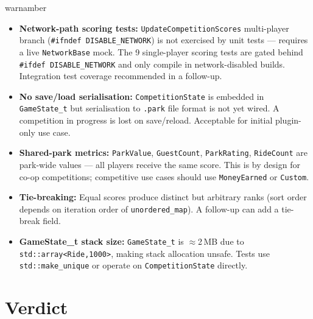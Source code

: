 \documentclass[12pt,a4paper]{article}
\begin{document}
\begin{calloutbox}[title={Honest gaps --- not blockers for merge}]{warnamber}
\begin{itemize}[noitemsep]
  \item \textbf{Network-path scoring tests:} \texttt{UpdateCompetitionScores} multi-player branch
    (\texttt{\#ifndef DISABLE\_NETWORK}) is not exercised by unit tests --- requires a live \texttt{NetworkBase}
    mock. The 9 single-player scoring tests are gated behind \texttt{\#ifdef DISABLE\_NETWORK} and only
    compile in network-disabled builds. Integration test coverage recommended in a follow-up.
  \item \textbf{No save/load serialisation:} \texttt{CompetitionState} is embedded in \texttt{GameState\_t}
    but serialisation to \texttt{.park} file format is not yet wired. A competition in progress is lost
    on save/reload. Acceptable for initial plugin-only use case.
  \item \textbf{Shared-park metrics:} \texttt{ParkValue}, \texttt{GuestCount}, \texttt{ParkRating},
    \texttt{RideCount} are park-wide values --- all players receive the same score. This is by design
    for co-op competitions; competitive use cases should use \texttt{MoneyEarned} or \texttt{Custom}.
  \item \textbf{Tie-breaking:} Equal scores produce distinct but arbitrary ranks (sort order depends
    on iteration order of \texttt{unordered\_map}). A follow-up can add a tie-break field.
  \item \textbf{GameState\_t stack size:} \texttt{GameState\_t} is $\approx$2\,MB due to
    \texttt{std::array<Ride,1000>}, making stack allocation unsafe. Tests use
    \texttt{std::make\_unique} or operate on \texttt{CompetitionState} directly.
\end{itemize}
\end{calloutbox}

\section{Verdict}
\end{document}
